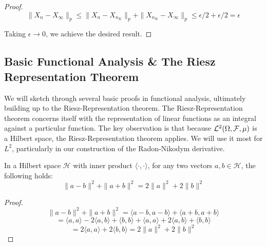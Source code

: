 \begin{proof}
        \[ \|X_n - X_\infty\|_p \leq \|X_n - X_{n_K}\|_p + \|X_{n_K} - X_\infty\|_p \leq \epsilon/2 + \epsilon/2 = \epsilon \]

        Taking $\epsilon \to 0$, we achieve the desired result.

    \end{proof}

    \subsection{Basic Functional Analysis \& The Riesz Representation Theorem}

    We will sketch through several basic proofs in functional analysis, ultimately building up to 
    the Riesz-Representation theorem. The Riesz-Representation theorem concerns itself with the representation of linear functions as 
    an integral against a particular function. The key observation is that because 
    $\mathcal L^2(\Omega, \mathcal F, \mu)$ is a Hilbert space, the Riesz-Representation theorem applies. 
    We will use it most for $L^2$, particularly in our 
    construction of the Radon-Nikodym derivative. 

    \begin{theorem}
        In a Hilbert space $\mathcal H$ with inner product $\langle \cdot , \cdot \rangle$, for any two vectors $a,b \in \mathcal H$, the following holds: 
        \[ \|a-b\|^2 + \|a+b\|^2 = 2\|a\|^2 + 2\|b\|^2 \]
    \end{theorem}
    \begin{proof} 
        \[ \|a-b\|^2 + \|a+b\|^2 = \langle a- b, a-b \rangle + \langle a+b,a+b\rangle \]
        \[ = \langle a, a \rangle - 2\langle a,b \rangle + \langle b, b \rangle  +  \langle a, a \rangle + 2\langle a,b \rangle + \langle b, b \rangle   \]
        \[ = 2\langle a , a \rangle + 2 \langle b, b \rangle = 2\|a\|^2 + 2\|b\|^2 \]
    \end{proof}


